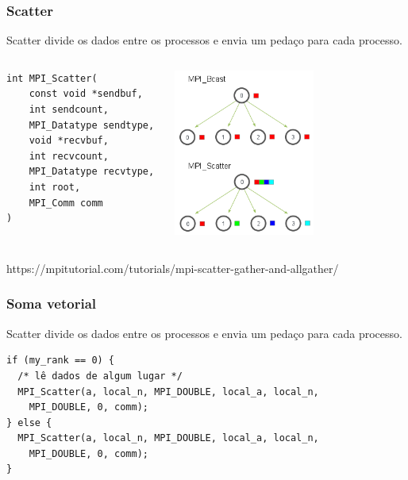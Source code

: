 \documentclass[xcolor={usenames,dvipsnames},12pt,presentation,aspectratio=169]{beamer}
\begin{document}
\begin{frame}[fragile]
  \frametitle{Scatter}
Scatter divide os dados entre os processos e envia um pedaço para cada processo.
\begin{columns}
  \begin{column}{0.5\textwidth} 
    \begin{center}
      \begin{minipage}{0.95\textwidth}
        \begin{verbatim}
int MPI_Scatter(
    const void *sendbuf,
    int sendcount,
    MPI_Datatype sendtype,
    void *recvbuf,
    int recvcount,
    MPI_Datatype recvtype,
    int root,
    MPI_Comm comm
)
        \end{verbatim}
      \end{minipage}
      \end{center}    
  \end{column}
  \begin{column}{0.5\textwidth}
    \begin{center}
    \includegraphics[width=0.6\textwidth]{broadcastvsscatter.png}
    \end{center}       
  \end{column}
\end{columns}
{\tiny https://mpitutorial.com/tutorials/mpi-scatter-gather-and-allgather/}
\end{frame}
\begin{frame}[fragile]
  \frametitle{Soma vetorial}
Scatter divide os dados entre os processos e envia um pedaço para cada processo.
\begin{center}
\begin{minipage}{0.95\textwidth}
  \begin{verbatim}
if (my_rank == 0) {
  /* lê dados de algum lugar */
  MPI_Scatter(a, local_n, MPI_DOUBLE, local_a, local_n, 
    MPI_DOUBLE, 0, comm);
} else {
  MPI_Scatter(a, local_n, MPI_DOUBLE, local_a, local_n,
    MPI_DOUBLE, 0, comm);
}
  \end{verbatim}
\end{minipage}
\end{center}
\end{frame}
\end{document}
